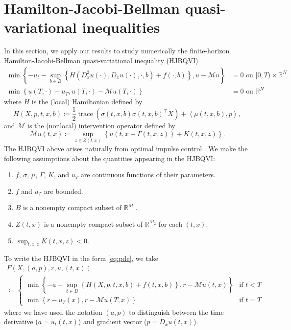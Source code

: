 \documentclass[12pt]{article}
\begin{document}
\section{\label{sec:hjbqvi}Hamilton-Jacobi-Bellman quasi-variational inequalities}

In this section, we apply our results to study numerically the finite-horizon
Hamilton-Jacobi-Bellman quasi-variational inequality (HJBQVI)
\begin{align}
\min\left\{ -u_{t}-\sup_{b\in B}\left\{ H(D_{x}^{2}u(\cdot),D_{x}u(\cdot),\cdot,b)+f(\cdot,b)\right\} ,u-\mathcal{M}u\right\}  & =0\text{ on }[0,T)\times\mathbb{R}^{N}\nonumber \\
\min\left\{ u(T,\cdot)-u_{T},u(T,\cdot)-\mathcal{M}u(T,\cdot)\right\}  & =0\text{ on }\mathbb{R}^{N}\label{eq:hjbqvi}
\end{align}
where $H$ is the (local) Hamiltonian defined by
\begin{equation}
H(X,p,t,x,b)\coloneqq\frac{1}{2}{\operatorname{trace}}(\sigma(t,x,b)\sigma(t,x,b)^{\intercal}X)+\left\langle \mu(t,x,b),p\right\rangle ,\label{eq:hamiltonian}
\end{equation}
and $\mathcal{M}$ is the (nonlocal) intervention operator defined
by
\begin{equation}
\mathcal{M}u(t,x)\coloneqq\sup_{z\in Z(t,x)}\left\{ u(t,x+\Gamma(t,x,z))+K(t,x,z)\right\} .\label{eq:intervention}
\end{equation}
The HJBQVI above arises naturally from optimal impulse control \cite{MR673169,MR2109687,MR2568293}.
We make the following assumptions about the quantities appearing in
the HJBQVI:
\begin{enumerate}[label=(H\arabic*)]
\item \label{enu:vanilla_start}$f$, $\sigma$, $\mu$, $\Gamma$, $K$,
and $u_{T}$ are continuous functions of their parameters.
\item $f$ and $u_{T}$ are bounded.
\item $B$ is a nonempty compact subset of $\mathbb{R}^{M_{1}}$.
\item $Z(t,x)$ is a nonempty compact subset of $\mathbb{R}^{M_{2}}$ for
each $(t,x)$.
\item \label{enu:vanilla_end}$\sup_{t,x,z}K(t,x,z)<0$.
\end{enumerate}

To write the HJBQVI in the form \eqref{eq:pde}, we take
\begin{multline}
F(X,(a,p),r,u,(t,x))\\
\coloneqq\begin{cases}
\min\left\{ -a-\sup_{b\in B}\left\{ H(X,p,t,x,b)+f(t,x,b)\right\} ,r-\mathcal{M}u(t,x)\right\}  & \text{if }t<T\\
\min\left\{ r-u_{T}(x),r-\mathcal{M}u(T,x)\right\}  & \text{if }t=T
\end{cases}\label{eq:hjbqvi_operator}
\end{multline}
where we have used the notation $(a,p)$ to distinguish between the
time derivative ($a=u_{t}(t,x)$) and gradient vector ($p=D_{x}u(t,x)$).
\end{document}
